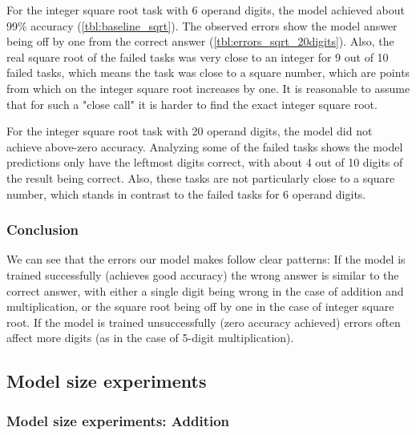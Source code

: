 For the integer square root task with 6 operand digits, the model achieved about 99\% accuracy (\cref{tbl:baseline_sqrt}). The observed errors show the model answer being off by one from the correct answer (\cref{tbl:errors_sqrt_20digits}). Also, the real square root of the failed tasks was very close to an integer for 9 out of 10 failed tasks, which means the task was close to a square number, which are points from which on the integer square root increases by one. It is reasonable to assume that for such a "close call" it is harder to find the exact integer square root.

For the integer square root task with 20 operand digits, the model did not achieve above-zero accuracy. Analyzing some of the failed tasks shows the model predictions only have the leftmost digits correct, with about 4 out of 10 digits of the result being correct. Also, these tasks are not particularly close to a square number, which stands in contrast to the failed tasks for 6 operand digits.

\subsubsection{Conclusion}

We can see that the errors our model makes follow clear patterns: If the model is trained successfully (achieves good accuracy) the wrong answer is similar to the correct answer, with either a single digit being wrong in the case of addition and multiplication, or the square root being off by one in the case of integer square root. If the model is trained unsuccessfully (zero accuracy achieved) errors often affect more digits (as in the case of 5-digit multiplication).







\subsection{Model size experiments}
\label{model_size_experiments}



\subsubsection{Model size experiments: Addition}

